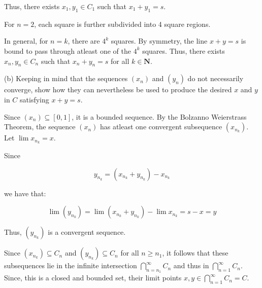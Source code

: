\documentclass[10pt]{article}
\begin{document}
Thus, there exists $\displaystyle x_{1} ,y_{1} \in C_{1}$ such that $\displaystyle x_{1} +y_{1} =s$. 



For $\displaystyle n=2$, each square is further subdivided into 4 square regions. 



In general, for $\displaystyle n=k$, there are $\displaystyle 4^{k}$ squares. By symmetry, the line $\displaystyle x+y=s$ is bound to pass through atleast one of the $\displaystyle 4^{k}$ squares. Thus, there exists $\displaystyle x_{n} ,y_{n} \in C_{n}$ such that $\displaystyle x_{n} +y_{n} =s$ for all $\displaystyle k\in \mathbf{N}$. 



(b) Keeping in mind that the sequences $\displaystyle ( x_{n})$ and $\displaystyle ( y_{n})$ do not necessarily converge, show how they can nevertheless be used to produce the desired $\displaystyle x$ and $\displaystyle y$ in $\displaystyle C$ satisfying $\displaystyle x+y=s$.



Since $\displaystyle ( x_{n}) \subseteq [ 0,1]$, it is a bounded sequence. By the Bolzanno Weierstrass Theorem, the sequence $\displaystyle ( x_{n})$ has atleast one convergent subsequence $\displaystyle ( x_{n_{k}})$. Let $\displaystyle \lim x_{n_{k}} =x$. 



Since


\begin{equation*}
y_{n_{k}} =( x_{n_{k}} +y_{n_{k}}) -x_{n_{k}}
\end{equation*}


we have that:


\begin{equation*}
\lim ( y_{n_{k}}) =\lim ( x_{n_{k}} +y_{n_{k}}) -\lim x_{n_{k}} =s-x=y
\end{equation*}


Thus, $\displaystyle ( y_{n_{k}})$ is a convergent sequence. 



Since $\displaystyle ( x_{n_{k}}) \subseteq C_{n}$ and $\displaystyle ( y_{n_{k}}) \subseteq C_{n}$ for all $\displaystyle n\geq n_{1}$, it follows that these subsequences lie in the infinite intersection $\displaystyle \bigcap _{n=n_{1}}^{\infty } C_{n}$ and thus in $\displaystyle \bigcap _{n=1}^{\infty } C_{n}$. Since, this is a closed and bounded set, their limit points $\displaystyle x,y\in \bigcap _{n=1}^{\infty } C_{n} =C$. \ 
\end{document}
